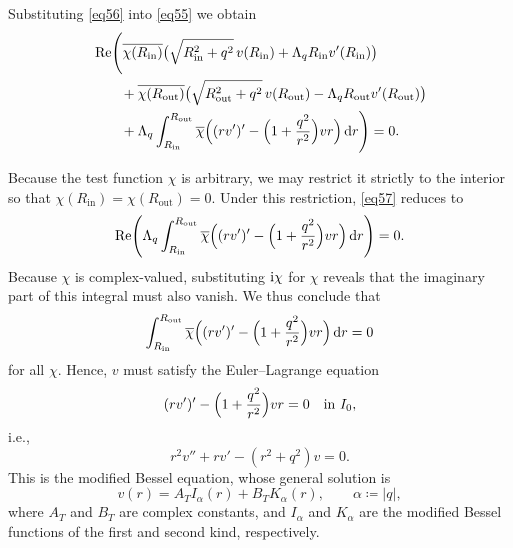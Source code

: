 \documentclass[12pt,reqno]{amsart}
\numberwithin{equation}{section}
\begin{document}
Substituting \eqref{eq56} into \eqref{eq55} we obtain
\begin{align}\label{eq57}
    &\operatorname{Re} \Biggl( \overline{\chi(R_{\mathrm{in}})} \bigl( \sqrt{R_{\mathrm{in}}^2 + q^2} \, v(R_{\mathrm{in}}) + \Lambda_q R_{\mathrm{in}} v'(R_{\mathrm{in}}) \bigr) \notag \\
    &\qquad + \overline{\chi(R_{\mathrm{out}})} \bigl( \sqrt{R_{\mathrm{out}}^2 + q^2} \, v(R_{\mathrm{out}}) - \Lambda_q R_{\mathrm{out}} v'(R_{\mathrm{out}}) \bigr) \notag \\
    &\qquad + \Lambda_q \int_{R_{\mathrm{in}}}^{R_{\mathrm{out}}} \overline{\chi} \Bigl( (r v')' - \Bigl(1 + \frac{q^2}{r^2}\Bigr) v r \Bigr) \, {\rm d}r \Biggr) = 0.
\end{align}

Because the test function $\chi$ is arbitrary, we may restrict it strictly to the interior so that $\chi(R_{\mathrm{in}}) = \chi(R_{\mathrm{out}}) = 0$. Under this restriction, \eqref{eq57} reduces to
\begin{equation}\label{eq61}
    \operatorname{Re} \Biggl( \Lambda_q \int_{R_{\mathrm{in}}}^{R_{\mathrm{out}}} \overline{\chi} \Bigl( (r v')' - \Bigl( 1 + \frac{q^2}{r^2} \Bigr) v r \Bigr) \, {\rm d}r \Biggr) = 0.
\end{equation}
Because $\chi$ is complex-valued, substituting ${\rm i}\chi$ for $\chi$ reveals that the imaginary part of this integral must also vanish. We thus conclude that
\begin{equation*}
    \int_{R_{\mathrm{in}}}^{R_{\mathrm{out}}} \overline{\chi} \Bigl( (r v')' - \Bigl( 1 + \frac{q^2}{r^2} \Bigr) v r \Bigr) \, {\rm d}r = 0
\end{equation*}
for all $\chi$. Hence, $v$ must satisfy the  Euler--Lagrange equation
\begin{equation}\label{eq59}
    (r v')' - \Bigl( 1 + \frac{q^2}{r^2} \Bigr) v r = 0 \quad \text{in } I_0,
\end{equation}
i.e.,
\begin{equation*}
    r^2 v'' + r v' - (r^2 + q^2) v = 0.
\end{equation*}
This is the modified Bessel equation, whose general solution is
\begin{equation}\label{eq58}
    v(r) = A_T I_{\alpha}(r) + B_T K_{\alpha}(r), \qquad \alpha \coloneqq |q|,
\end{equation}
where $A_T$ and $B_T$ are complex constants, and $I_{\alpha}$ and $K_{\alpha}$ are the modified Bessel functions of the first and second kind, respectively.
\end{document}
